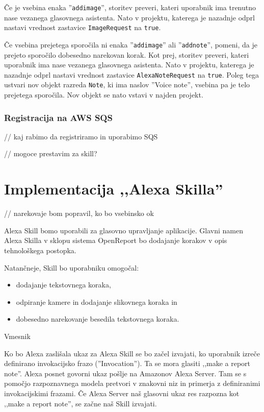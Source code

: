 \documentclass[a4paper, 12pt]{book}
\begin{document}
Če je vsebina enaka ''\texttt{addimage}'', storitev preveri, kateri uporabnik ima trenutno nase vezanega glasovnega asistenta.
Nato v projektu, katerega je nazadnje odprl nastavi vrednost zastavice \texttt{ImageRequest} na \texttt{true}.

Če vsebina prejetega sporočila ni enaka ''\texttt{addimage}'' ali ''\texttt{addnote}'', pomeni, da je prejeto sporočilo dobesedno narekovan korak.
Kot prej, storitev preveri, kateri uporabnik ima nase vezanega glasovnega asistenta.
Nato v projektu, katerega je nazadnje odprl nastavi vrednost zastavice \texttt{AlexaNoteRequest} na \texttt{true}.
Poleg tega ustvari nov objekt razreda \texttt{Note}, ki ima naslov ''Voice note'', vsebina pa je telo prejetega sporočila.
Nov objekt se nato vstavi v najden projekt.

\subsubsection{Registracija na AWS SQS}

// kaj rabimo da registriramo in uporabimo SQS

// mogoce prestavim za skill?

\section{Implementacija ,,Alexa Skilla''}

// narekovaje bom popravil, ko bo vsebinsko ok

Alexa Skill bomo uporabili za glasovno upravljanje aplikacije.
Glavni namen Alexa Skilla v sklopu sistema OpenReport bo dodajanje korakov v opis tehnološkega postopka.

\noindent Natančneje, Skill bo uporabniku omogočal:
\begin{itemize}
	\item dodajanje tekstovnega koraka,
	\item odpiranje kamere in dodajanje slikovnega koraka in
	\item dobesedno narekovanje besedila tekstovnega koraka.
\end{itemize}

Vmesnik 

Ko bo Alexa zaslišala ukaz za 
Alexa Skill se bo začel izvajati, ko uporabnik izreče definirano invokacijsko frazo (''Invocation'').
Ta se mora glasiti ,,make a report note''.
Alexa posnet govorni ukaz pošlje na Amazonov Alexa Server.
Tam se s pomočjo razpoznavnega modela pretvori v znakovni niz in primerja z definiranimi invokacijskimi frazami.
Če Alexa Server naš glasovni ukaz res razpozna kot ,,make a report note'', se začne naš Skill izvajati.
\end{document}
